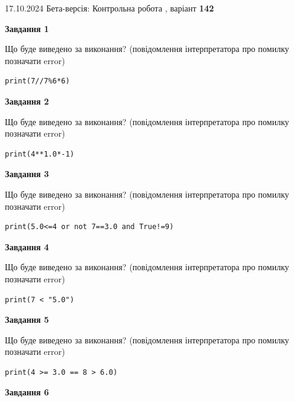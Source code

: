 \documentclass[12pt, ukrainian]{article}
\begin{document}
{\Large{17.10.2024 Бета-версія: Контрольна робота , варіант  \No \textbf { 142 }\par}}
{
\begin {large}
{\begin {center}\textbf{Завдання 1}\end {center}}

Що буде виведено за виконання? (повідомлення інтерпретатора про помилку позначати error)\par
\begin{verbatim}
print(7//7%6*6)
\end{verbatim}

{\begin {center}\textbf{Завдання 2}\end {center}}

Що буде виведено за виконання? (повідомлення інтерпретатора про помилку позначати error)\par
\begin{verbatim}
print(4**1.0*-1)
\end{verbatim}

{\begin {center}\textbf{Завдання 3}\end {center}}

Що буде виведено за виконання? (повідомлення інтерпретатора про помилку позначати error)\par
\begin{verbatim}
print(5.0<=4 or not 7==3.0 and True!=9)
\end{verbatim}

{\begin {center}\textbf{Завдання 4}\end {center}}

Що буде виведено за виконання? (повідомлення інтерпретатора про помилку позначати error)\par
\begin{verbatim}
print(7 < "5.0")
\end{verbatim}

{\begin {center}\textbf{Завдання 5}\end {center}}

Що буде виведено за виконання? (повідомлення інтерпретатора про помилку позначати error)\par
\begin{verbatim}
print(4 >= 3.0 == 8 > 6.0)
\end{verbatim}

{\begin {center}\textbf{Завдання 6}\end {center}}


\end{large}}
\end{document}

